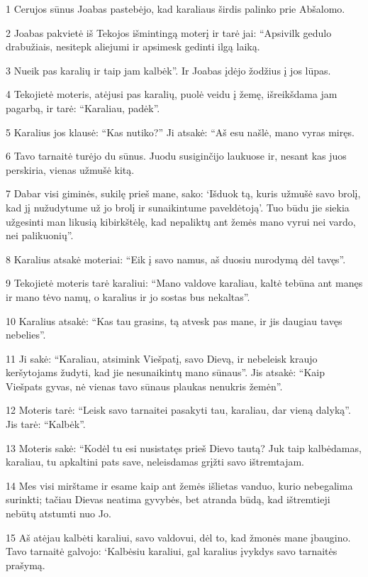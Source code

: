 \par 1 Cerujos sūnus Joabas pastebėjo, kad karaliaus širdis palinko prie Abšalomo. 
\par 2 Joabas pakvietė iš Tekojos išmintingą moterį ir tarė jai: “Apsivilk gedulo drabužiais, nesitepk aliejumi ir apsimesk gedinti ilgą laiką. 
\par 3 Nueik pas karalių ir taip jam kalbėk”. Ir Joabas įdėjo žodžius į jos lūpas. 
\par 4 Tekojietė moteris, atėjusi pas karalių, puolė veidu į žemę, išreikšdama jam pagarbą, ir tarė: “Karaliau, padėk”. 
\par 5 Karalius jos klausė: “Kas nutiko?” Ji atsakė: “Aš esu našlė, mano vyras miręs. 
\par 6 Tavo tarnaitė turėjo du sūnus. Juodu susiginčijo laukuose ir, nesant kas juos perskiria, vienas užmušė kitą. 
\par 7 Dabar visi giminės, sukilę prieš mane, sako: ‘Išduok tą, kuris užmušė savo brolį, kad jį nužudytume už jo brolį ir sunaikintume paveldėtoją’. Tuo būdu jie siekia užgesinti man likusią kibirkštėlę, kad nepaliktų ant žemės mano vyrui nei vardo, nei palikuonių”. 
\par 8 Karalius atsakė moteriai: “Eik į savo namus, aš duosiu nurodymą dėl tavęs”. 
\par 9 Tekojietė moteris tarė karaliui: “Mano valdove karaliau, kaltė tebūna ant manęs ir mano tėvo namų, o karalius ir jo sostas bus nekaltas”. 
\par 10 Karalius atsakė: “Kas tau grasins, tą atvesk pas mane, ir jis daugiau tavęs nebelies”. 
\par 11 Ji sakė: “Karaliau, atsimink Viešpatį, savo Dievą, ir nebeleisk kraujo keršytojams žudyti, kad jie nesunaikintų mano sūnaus”. Jis atsakė: “Kaip Viešpats gyvas, nė vienas tavo sūnaus plaukas nenukris žemėn”. 
\par 12 Moteris tarė: “Leisk savo tarnaitei pasakyti tau, karaliau, dar vieną dalyką”. Jis tarė: “Kalbėk”. 
\par 13 Moteris sakė: “Kodėl tu esi nusistatęs prieš Dievo tautą? Juk taip kalbėdamas, karaliau, tu apkaltini pats save, neleisdamas grįžti savo ištremtajam. 
\par 14 Mes visi mirštame ir esame kaip ant žemės išlietas vanduo, kurio nebegalima surinkti; tačiau Dievas neatima gyvybės, bet atranda būdą, kad ištremtieji nebūtų atstumti nuo Jo. 
\par 15 Aš atėjau kalbėti karaliui, savo valdovui, dėl to, kad žmonės mane įbaugino. Tavo tarnaitė galvojo: ‘Kalbėsiu karaliui, gal karalius įvykdys savo tarnaitės prašymą. 
